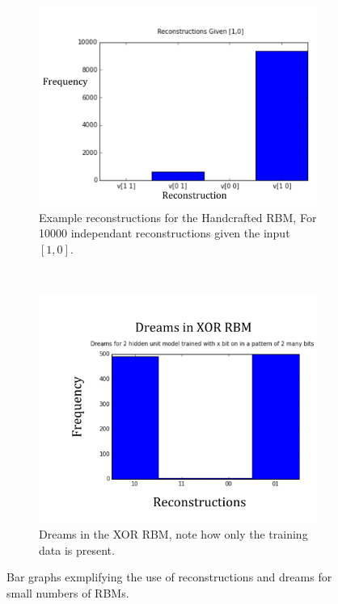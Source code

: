 \begin{description}
  \begin{figure}[htb]
  \centering
  \begin{subfigure}[t]{0.4\textwidth}
      \includegraphics[width=\textwidth]{Assets/Two-Bit-RBM-Recon.png}
      \caption{Example reconstructions for the Handcrafted RBM, For 10000 independant reconstructions given the input $[1,0]$.}
      \label{F:Two-Bit-RBM-Recons}
  \end{subfigure}
  ~ %
  \begin{subfigure}[t]{0.4\textwidth}
      \includegraphics[width=\textwidth]{Assets/XOR-RBM-Dreams.png}
      \caption{Dreams in the XOR RBM, note how only the training data is present.}
      \label{F:Two-Bit-RBM-Dreams}
  \end{subfigure}
  \caption{Bar graphs exmplifying the use of reconstructions and dreams for small numbers of RBMs.}\label{F:XOR-Example-Plots}
\end{figure}



\end{description}
